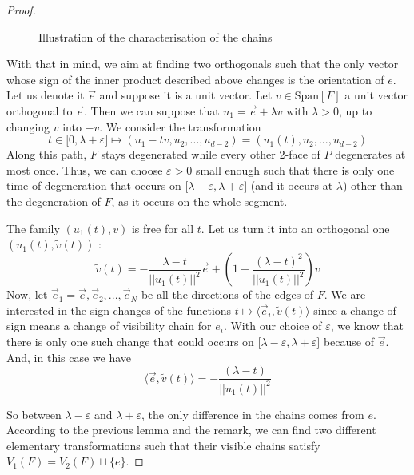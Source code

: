 \documentclass[12pt, notitlepage]{article}
\theoremstyle{plain}
\theoremstyle{definition}
\theoremstyle{plain}
\theoremstyle{remark}
\theoremstyle{plain}
\theoremstyle{plain}
\newcommand{\vect}{\text{Span}}
\begin{document}
\begin{proof}
\begin{figure}[ht]
        \caption{Illustration of the characterisation of the chains}
        \label{inner product}
    \end{figure}

    With that in mind, we aim at finding two orthogonals such that the only vector whose sign of the inner product described above changes is the orientation of $e$. Let us denote it $\vec e$ and suppose it is a unit vector. Let $v \in \vect[F]$ a unit vector orthogonal to $\vec e$. Then we can suppose that $u_1 = \vec e + \lambda v$ with $\lambda>0$, up to changing $v$ into $-v$. We consider the transformation \[ t\in \mathopen[0,\lambda+\varepsilon \mathclose] \mapsto (u_1-tv,u_2,...,u_{d-2})=(u_1(t),u_2,...,u_{d-2}) \] Along this path, $F$ stays degenerated while every other 2-face of $P$ degenerates at most once. Thus, we can choose $\varepsilon>0$ small enough such that there is only one time of degeneration that occurs on $\mathopen[ \lambda-\varepsilon,\lambda+\varepsilon \mathclose]$ (and it occurs at $\lambda$) other than the degeneration of $F$, as it occurs on the whole segment.
    
    The family $(u_1(t),v)$ is free for all $t$. Let us turn it into an orthogonal one $(u_1(t),\tilde v(t))$ : \[ \tilde v(t) = -\frac{\lambda-t}{||u_1(t)||^2}\vec e + \left(1+ \frac{(\lambda-t)^2}{||u_1(t)||^2} \right)v \] Now, let $\vec e_1 = \vec e,\vec e_2,...,\vec e_N$ be all the directions of the edges of $F$. We are interested in the sign changes of the functions $t\mapsto \langle \vec e_i,\tilde v(t) \rangle $ since a change of sign means a change of visibility chain for $e_i$. With our choice of $\varepsilon$, we know that there is only one such change that could occurs on $\mathopen[ \lambda-\varepsilon,\lambda+\varepsilon \mathclose]$ because of $\vec e$. And, in this case we have \[ \langle \vec e,\tilde v(t) \rangle = -\frac{(\lambda-t)}{||u_1(t)||^2} \]
    
    So between $\lambda-\varepsilon$ and $\lambda+\varepsilon$, the only difference in the chains comes from $e$. According to the previous lemma and the remark, we can find two different elementary transformations such that their visible chains satisfy $V_{1}(F) = V_{2}(F) \sqcup \{e\}$.
\end{proof}
\end{document}
